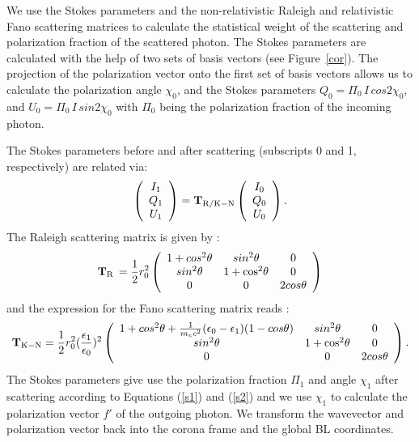 \documentclass[manuscript]{aastex}
\begin{document}
We use the Stokes parameters and the non-relativistic Raleigh and relativistic Fano  
scattering matrices to calculate the statistical weight of the scattering and polarization fraction of the scattered photon. 
The Stokes parameters are calculated with the help of two sets of basis vectors (see Figure~\ref{cor}).
%
The projection of the polarization vector onto the first set of basis vectors allows us to calculate
the polarization angle $\chi_0$, and the Stokes parameters 
$Q_0=\Pi_0 \,I\, cos2\chi_0$, and $U_0=\Pi_0\, I\, sin2\chi_0$
with $\Pi_0$ being the polarization fraction of the incoming photon.

The Stokes parameters before and after scattering (subscripts 0 and 1, respectively) are related via: 
\begin{equation}
\left(
\begin{array}{c}
I_1\\
Q_1 \\
U_1\\
\end{array}\right)
= \mathbf{T_{\rm R/K-N}} 
\left(
\begin{array}{c}
I_0\\
Q_0\\
U_0\\
\end{array}\right).
\end{equation}
The Raleigh scattering matrix is given by \citep{cha60}:
\begin{equation}
\mathbf{T_{\rm R}}\,=\frac{1}{2}r_0^2\left(
\begin{array}{ccc}
1+cos^2\theta & sin^2\theta & 0 \\
sin^2\theta & 1+{\rm cos}^2\theta & 0 \\
0 & 0 & 2cos\theta
\end{array}\right)
 \end{equation}
and the expression for the Fano scattering matrix reads \citep{fan57,mcm61}:
\begin{equation}\label{c}
\mathbf{T_{\rm K-N}}=\frac{1}{2}r_0^2(\frac{\epsilon_1}{\epsilon_0})^2\left(
\begin{array}{ccc}
1+cos^2\theta+\frac{1}{m_ec^2}(\epsilon_0-\epsilon_1)(1-cos\theta) & sin^2\theta & 0 \\
sin^2\theta & 1+{\rm cos}^2\theta & 0 \\
0 & 0 & 2cos\theta
\end{array}\right).
\end{equation}
The Stokes parameters give use the polarization fraction $\Pi_1$ and angle $\chi_1$ after scattering
according to Equations (\ref{s1}) and (\ref{s2}) and we use $\chi_1$ to calculate the polarization 
vector $f'$ of the outgoing photon. We transform the wavevector and polarization vector 
back into the corona frame and the global BL coordinates.
 
\end{document}
